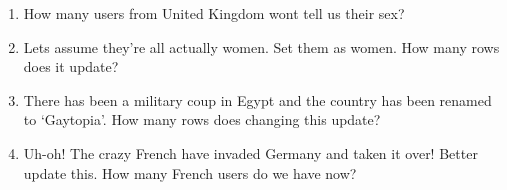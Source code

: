 \documentclass[10pt,a4paper]{article}
\begin{document}
\begin{enumerate}
\item How many users from United Kingdom wont tell us their sex?
\item Lets assume they're all actually women. Set them as women. How many rows does it update?
\item There has been a military coup in Egypt and the country has been renamed to `Gaytopia'. How many rows does changing this update?
\item Uh-oh! The crazy French have invaded Germany and taken it over! Better update this. How many French users do we have now?
\end{enumerate}
\end{document}
